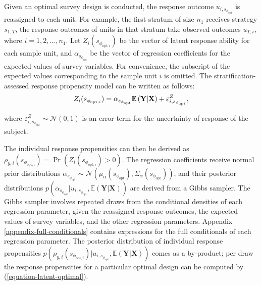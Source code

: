 \documentclass[12pt]{article}
\begin{document}
Given an optimal survey design is conducted, the response outcome $u_{i,s_{\phi_{\mathrm{opt}}}}$ is reassigned to each unit.
For example, the first stratum of size $n_1$ receives strategy $s_{1,T}$, the response outcomes of units in that stratum take observed outcomes $u_{T,i}$, where $i=1,2,\dots,n_1$.
Let $Z_i(s_{\phi_{\mathrm{opt},i}})$ be the vector of latent response ability for each sample unit, and $\alpha_{s_{\phi_{\mathrm{opt}}}}$ be the vector of regression coefficients for the expected values of survey variables.
For convenience, the subscript of the expected values corresponding to the sample unit $i$ is omitted.
The stratification-assessed response propensity model can be written as follows:
\let\saveeqnno\theequation
\let\savefrac\frac
\def\dispfrac{\displaystyle\savefrac}
\begin{eqnarray}
\let\frac\dispfrac
\gdef\theequation{16}
\let\theHequation\theequation
\label{equation-latent-optimal}
	Z_i(s_{\phi_{\mathrm{opt},i}})=\alpha_{s_{\phi_{\mathrm{opt}}}}\mathbb{E}\left(\mathbf{Y}|\mathbf{X}\right)+\varepsilon^{Z}_{i,s_{\phi_{\mathrm{opt}}}},
\end{eqnarray}
\global\let\theequation\saveeqnno
\addtocounter{equation}{-1}\ignorespaces

where $\varepsilon^{Z}_{i,s_{\phi_{\mathrm{opt}}}}\sim \mathcal{N}(0,1)$ is an error term for the uncertainty of response of the subject.


The individual response propensities can then be derived as $\rho_{y,i}(s_{\phi_{\mathrm{opt},i}})=\Pr\left(Z_{i}(s_{\phi_{\mathrm{opt},i}})>0\right)$.
The regression coefficients receive normal prior distributions $\alpha_{s_{\phi_{\mathrm{opt}}}} \sim \mathcal{N}\left(\mu_\alpha(s_{\phi_{\mathrm{opt}}}), \Sigma_\alpha(s_{\phi_{\mathrm{opt}}})\right)$, and their posterior distributions $p(\alpha_{s_{\phi_{\mathrm{opt}}}}|u_{i,s_{\phi_{\mathrm{opt}}}},\mathbb{E}\left(\mathbf{Y}|\mathbf{X}\right))$ are derived from a Gibbs sampler.
The Gibbs sampler involves repeated draws from the conditional densities of each regression parameter, given the reassigned response outcomes, the expected values of survey variables, and the other regression parameters. Appendix \ref{appendix-full-conditionals} contains expressions for the full conditionals of each regression parameter.
The posterior distribution of individual response propensities $p(\rho_{y,i}(s_{\phi_{\mathrm{opt},i}})|u_{i,s_{\phi_{\mathrm{opt}}}},\mathbb{E}\left(\mathbf{Y}|\mathbf{X}\right))$ comes as a by-product; per draw the response propensities for a particular optimal design can be computed by (\ref{equation-latent-optimal}).
\end{document}
